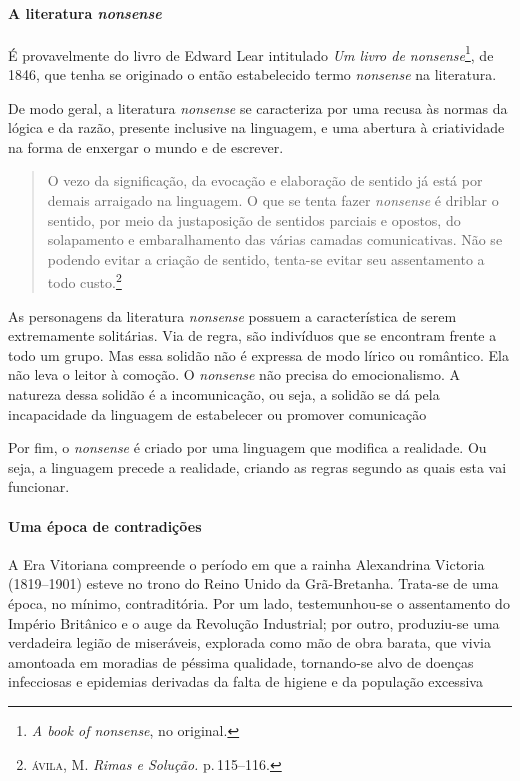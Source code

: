\documentclass[11pt]{extarticle}
\begin{document}
\paragraph{A literatura \textit{nonsense}} É provavelmente do livro de Edward Lear intitulado
\textit{Um livro de \emph{nonsense}}\footnote{\textit{A book of \emph{nonsense}}, no original.},
de 1846, que tenha se originado o então estabelecido termo \textit{nonsense} na literatura. 

De modo geral, a literatura \textit{nonsense} se caracteriza por uma recusa
às normas da lógica e da razão, presente inclusive na linguagem, 
e uma abertura à criatividade na forma de enxergar o mundo e de 
escrever. 

\begin{quote}
O vezo da significação, da evocação e elaboração de sentido já está por demais arraigado na
linguagem. O que se tenta fazer \textit{nonsense} é driblar o sentido, por meio da
justaposição de sentidos parciais e opostos, do solapamento e
embaralhamento das várias camadas comunicativas. Não se podendo evitar
a criação de sentido, tenta-se evitar seu assentamento a todo custo.\footnote{\textsc{ávila}, M. \textit{Rimas e Solução.}
p.\,115--116.}
\end{quote}


As personagens da literatura \textit{nonsense} possuem a característica
de serem extremamente solitárias. Via de regra, são indivíduos que se encontram
frente a todo um grupo. Mas essa solidão não é expressa de modo lírico ou romântico.
Ela não leva o leitor à comoção. O \textit{nonsense} não precisa do emocionalismo. 
A natureza dessa solidão é a incomunicação, ou seja, a solidão se dá pela incapacidade
da linguagem de estabelecer ou promover comunicação

Por fim, o \textit{nonsense} é criado por uma linguagem que modifica a realidade.
Ou seja, a linguagem precede a realidade, criando as regras segundo as quais
esta vai funcionar. 

\paragraph{Uma época de contradições}

A Era Vitoriana compreende o período em que a rainha Alexandrina Victoria (1819--1901)
esteve no trono do Reino Unido da Grã-Bretanha.
Trata-se de uma época, no mínimo, contraditória. Por um lado, testemunhou-se o
assentamento do Império Britânico e o auge da Revolução Industrial; por outro, produziu-se 
uma verdadeira legião de miseráveis, explorada como mão de obra barata, que vivia amontoada 
em moradias de péssima qualidade, tornando-se alvo de doenças infecciosas e epidemias derivadas da 
falta de higiene e da população excessiva
\end{document}
